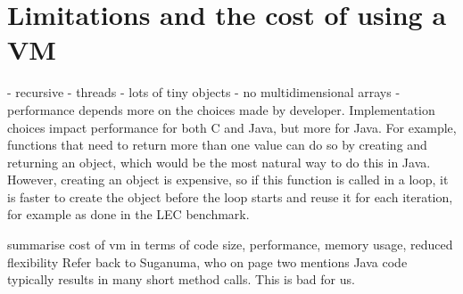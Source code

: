 \section{Limitations and the cost of using a VM}
\label{sec-evaluation-limitations}
 - recursive
 - threads
 - lots of tiny objects
 - no multidimensional arrays
 - performance depends more on the choices made by developer. Implementation choices impact performance for both C and Java, but more for Java. For example, functions that need to return more than one value can do so by creating and returning an object, which would be the most natural way to do this in Java. However, creating an object is expensive, so if this function is called in a loop, it is faster to create the object before the loop starts and reuse it for each iteration, for example as done in the LEC benchmark.


summarise cost of vm in terms of code size, performance, memory usage, reduced flexibility
Refer back to Suganuma, who on page two mentions Java code typically results in many short method calls. This is bad for us.




